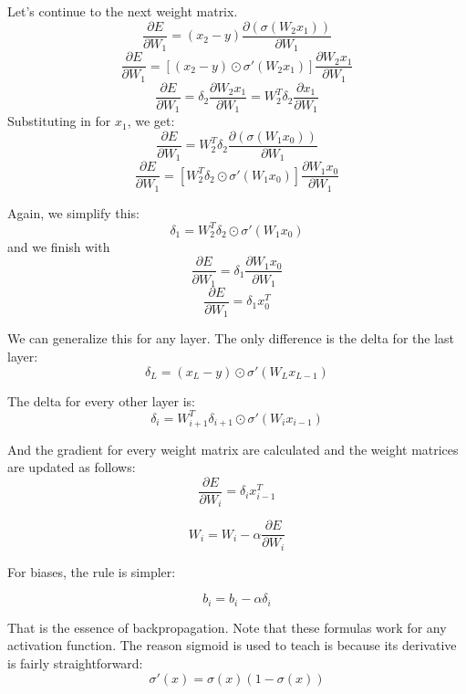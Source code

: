 \documentclass{article}
\begin{document}
Let's continue to the next weight matrix.
\[\frac{\partial E}{\partial W_1} = (x_2 - y) \frac{\partial (\sigma(W_2x_1))}{\partial W_1}\]
\[\frac{\partial E}{\partial W_1} = [(x_2-y) \odot \sigma'(W_2x_1)] \frac{\partial W_2x_1}{\partial W_1}\]
\[\frac{\partial E}{\partial W_1} = \delta_2 \frac{\partial W_2x_1}{\partial W_1} = W_2^T\delta_2 \frac{\partial x_1}{\partial W_1}\]
Substituting in for $x_1$, we get:
\[\frac{\partial E}{\partial W_1} = W_2^T\delta_2 \frac{\partial (\sigma(W_1x_0))}{\partial W_1}\]
\[\frac{\partial E}{\partial W_1} = [W_2^T\delta_2 \odot \sigma'(W_1x_0)]\frac{\partial W_1x_0}{\partial W_1}\]

Again, we simplify this:
\[\delta_1 = W_2^T\delta_2 \odot \sigma'(W_1x_0)\]
and we finish with
\[\frac{\partial E}{\partial W_1} = \delta_1 \frac{\partial W_1x_0}{\partial W_1}\]
\[\frac{\partial E}{\partial W_1} = \delta_1 x_0^T\]

We can generalize this for any layer. The only difference is the delta for the last layer:
\[\delta_L = (x_L - y) \odot \sigma'(W_{L}x_{L-1})\]

The delta for every other layer is:
\[\delta_i = W_{i+1}^T\delta_{i+1} \odot \sigma'(W_ix_{i-1})\]

And the gradient for every weight matrix are calculated and the weight matrices are updated as follows:
\[\frac{\partial E}{\partial W_i} = \delta_i x_{i-1}^T\]

\[W_i =  W_i - \alpha \frac{\partial E}{\partial W_i}\]

For biases, the rule is simpler:

\[b_i =  b_i - \alpha \delta_i\]

That is the essence of backpropagation. Note that these formulas work for any activation function. The reason sigmoid is used to teach is because its derivative is fairly straightforward:
\[\sigma'(x) = \sigma(x)(1-\sigma(x))\]
\end{document}
